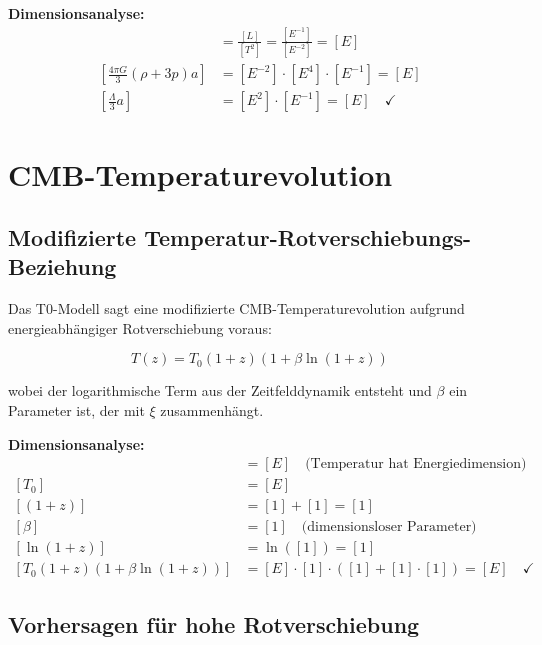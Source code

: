 \documentclass[12pt,a4paper]{report}
\begin{document}
	\textbf{Dimensionsanalyse:}
	\begin{align}
		[\ddot{a}] &= \frac{[L]}{[T^2]} = \frac{[E^{-1}]}{[E^{-2}]} = [E] \\
		\left[\frac{4\pi G}{3}(\rho + 3p)a\right] &= [E^{-2}] \cdot [E^4] \cdot [E^{-1}] = [E] \\
		\left[\frac{\Lambda}{3}a\right] &= [E^2] \cdot [E^{-1}] = [E] \quad \checkmark
	\end{align}
	
	\section{CMB-Temperaturevolution}
	\label{sec:cmb_temperature_evolution}
	
	\subsection{Modifizierte Temperatur-Rotverschiebungs-Beziehung}
	\label{subsec:modified_temperature_redshift}
	
	Das T0-Modell sagt eine modifizierte CMB-Temperaturevolution aufgrund energieabhängiger Rotverschiebung voraus:
	
	\begin{equation}
		\boxed{T(z) = T_0(1+z)\left(1 + \beta \ln(1+z)\right)}
		\label{eq:cmb_temperature_evolution}
	\end{equation}
	
	wobei der logarithmische Term aus der Zeitfelddynamik entsteht und $\beta$ ein Parameter ist, der mit $\xi$ zusammenhängt.
	
	\textbf{Dimensionsanalyse:}
	\begin{align}
		[T(z)] &= [E] \quad \text{(Temperatur hat Energiedimension)} \\
		[T_0] &= [E] \\
		[(1+z)] &= [1] + [1] = [1] \\
		[\beta] &= [1] \quad \text{(dimensionsloser Parameter)} \\
		[\ln(1+z)] &= \ln([1]) = [1] \\
		[T_0(1+z)(1 + \beta \ln(1+z))] &= [E] \cdot [1] \cdot ([1] + [1] \cdot [1]) = [E] \quad \checkmark
	\end{align}
	
	\subsection{Vorhersagen für hohe Rotverschiebung}
	\label{subsec:high_redshift_predictions}
	
\end{document}
